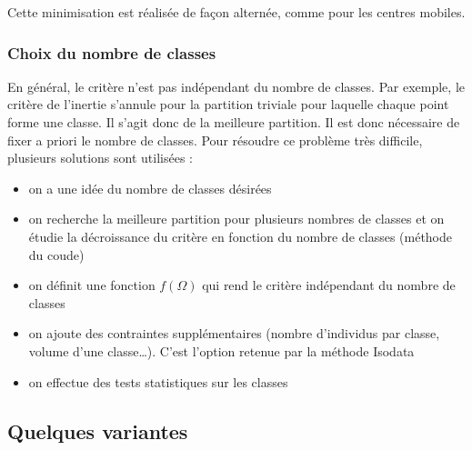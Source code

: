 \documentclass[letterpaper,10pt,french]{sphinxmanual}
\begin{document}
\sphinxAtStartPar
Cette minimisation est réalisée de façon alternée, comme pour les centres mobiles.


\subsubsection{Choix du nombre de classes}
\label{\detokenize{clustering:choix-du-nombre-de-classes}}
\sphinxAtStartPar
En général, le critère n’est pas indépendant du nombre de classes. Par exemple, le critère de l’inertie s’annule pour la partition triviale pour laquelle chaque point forme une classe. Il s’agit donc de la meilleure partition. Il est donc
nécessaire de fixer a priori le nombre de classes. Pour résoudre ce problème très difficile, plusieurs solutions sont utilisées :
\begin{itemize}
\item {} 
\sphinxAtStartPar
on a une idée du nombre de classes désirées

\item {} 
\sphinxAtStartPar
on recherche la meilleure partition pour plusieurs nombres de classes et on étudie la décroissance du critère en fonction du nombre de classes (méthode du coude)

\item {} 
\sphinxAtStartPar
on définit une fonction \(f(\Omega)\) qui rend le critère indépendant du nombre de classes

\item {} 
\sphinxAtStartPar
on ajoute des contraintes supplémentaires (nombre d’individus par classe, volume d’une classe…). C’est l’option retenue par la méthode Isodata

\item {} 
\sphinxAtStartPar
on effectue des tests statistiques sur les classes

\end{itemize}


\subsection{Quelques variantes}
\label{\detokenize{clustering:quelques-variantes}}
\end{document}
